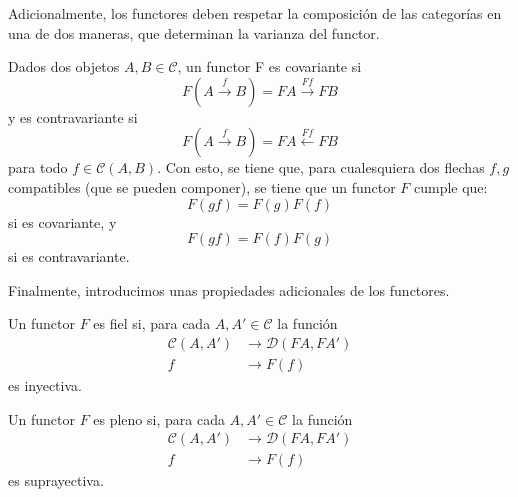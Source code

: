 Adicionalmente, los functores deben respetar la composición de las categorías en una de dos maneras, que determinan la varianza del functor.
\begin{defn}
    Dados dos objetos $A,B\in\mathcal{C}$, un functor F es covariante si
    \begin{equation*}
        F(A\overset{f}{\to}B)=FA\overset{Ff}{\to}FB
    \end{equation*}
    y es contravariante si
    \begin{equation*}
        F(A\overset{f}{\to}B)=FA\overset{Ff}{\leftarrow}FB
    \end{equation*}
    para todo $f\in\mathcal{C}(A,B)$.
    Con esto, se tiene que, para cualesquiera dos flechas $f,g$ compatibles (que se pueden componer), se tiene que un functor $F$ cumple que:
    \begin{equation*}
        F(gf)=F(g)F(f)
    \end{equation*}
    si es covariante, y 
    \begin{equation*}
        F(gf)=F(f)F(g)
    \end{equation*}
    si es contravariante.
\end{defn}
Finalmente, introducimos unas propiedades adicionales de los functores.
\begin{defn}[Fidelidad]
    Un functor $F$ es fiel si, para cada $A,A'\in\mathcal{C}$ la función 
    \begin{align*}
        \mathcal{C}(A,A') & \to \mathcal{D}(FA,FA')\\
        f & \to F(f)
    \end{align*}
    es inyectiva.
\end{defn}
\begin{defn}[Plenitud]
    Un functor $F$ es pleno si, para cada $A,A'\in\mathcal{C}$ la función 
    \begin{align*}
        \mathcal{C}(A,A') & \to \mathcal{D}(FA,FA')\\
        f & \to F(f)
    \end{align*}
    es suprayectiva.
\end{defn}

